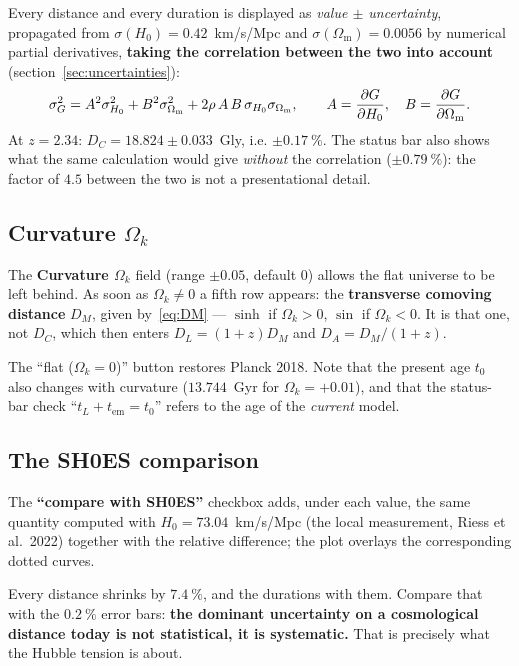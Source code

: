 \documentclass[11pt,a4paper,openany]{report}
\newcommand{\Hzero}{H_{0}}
\newcommand{\Om}{\Omega_{\mathrm{m}}}
\newcommand{\Ok}{\Omega_{k}}
\begin{document}
\begin{tcolorbox}[gui]
Every distance and every duration is displayed as \emph{value $\pm$
uncertainty}, propagated from $\sigma(\Hzero) = 0.42$~km/s/Mpc and
$\sigma(\Om) = 0.0056$ by numerical partial derivatives, \textbf{taking the
correlation between the two into account} (section~\ref{sec:uncertainties}):
\[
\sigma_G^{2} = A^{2}\sigma_{\Hzero}^{2} + B^{2}\sigma_{\Om}^{2}
             + 2\rho\,A\,B\,\sigma_{\Hzero}\sigma_{\Om},
\qquad A = \pdv{G}{\Hzero},\quad B = \pdv{G}{\Om}.
\]
At $z = 2.34$: $D_{C} = 18.824 \pm 0.033$~Gly, i.e. $\pm0.17~\%$. The status bar
also shows what the same calculation would give \emph{without} the correlation
($\pm0.79~\%$): the factor of $4.5$ between the two is not a presentational
detail.
\end{tcolorbox}

\subsection{Curvature $\Ok$}

\begin{tcolorbox}[gui]
The \textbf{Curvature $\Ok$} field (range $\pm0.05$, default $0$) allows the
flat universe to be left behind. As soon as $\Ok \ne 0$ a fifth row appears: the
\textbf{transverse comoving distance} $D_{M}$, given by~\eqref{eq:DM} ---
$\sinh$ if $\Ok>0$, $\sin$ if $\Ok<0$. It is that one, not $D_{C}$, which then
enters $D_{L} = (1+z)D_{M}$ and $D_{A} = D_{M}/(1+z)$.

\medskip
The “flat ($\Ok = 0$)” button restores Planck 2018. Note that the present age
$t_{0}$ also changes with curvature ($13.744$~Gyr for $\Ok = +0.01$), and that
the status-bar check “$t_L + t_{\text{em}} = t_{0}$” refers to the age of the
\emph{current} model.
\end{tcolorbox}

\subsection{The SH0ES comparison}

\begin{tcolorbox}[gui]
The \textbf{“compare with SH0ES”} checkbox adds, under each value, the same
quantity computed with $\Hzero = 73.04$~km/s/Mpc (the local measurement, Riess
et al.~2022) together with the relative difference; the plot overlays the
corresponding dotted curves.

\medskip
Every distance shrinks by $7.4~\%$, and the durations with them. Compare that
with the $0.2~\%$ error bars: \textbf{the dominant uncertainty on a
cosmological distance today is not statistical, it is systematic.} That is
precisely what the Hubble tension is about.
\end{tcolorbox}
\end{document}
